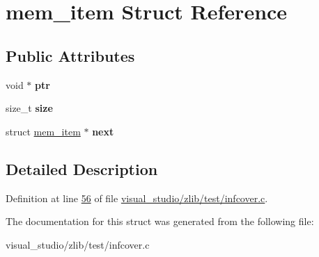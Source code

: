 \hypertarget{structmem__item}{}\section{mem\+\_\+item Struct Reference}
\label{structmem__item}
\subsection*{Public Attributes}
\begin{DoxyCompactItemize}
\item 
\mbox{\label{structmem__item_a486c57a912ffde6ffdb53d374d06114d}} 
void $\ast$ {\bfseries ptr}
\item 
\mbox{\label{structmem__item_acc5bc924e058e6ab12afa4d502522e56}} 
size\+\_\+t {\bfseries size}
\item 
\mbox{\label{structmem__item_abd83b4b290f08494909e7e7fce848690}} 
struct \hyperlink{structmem__item}{mem\+\_\+item} $\ast$ {\bfseries next}
\end{DoxyCompactItemize}


\subsection{Detailed Description}


Definition at line \hyperlink{visual__studio_2zlib_2test_2infcover_8c_source_l00056}{56} of file \hyperlink{visual__studio_2zlib_2test_2infcover_8c_source}{visual\+\_\+studio/zlib/test/infcover.\+c}.



The documentation for this struct was generated from the following file\+:\begin{DoxyCompactItemize}
\item 
visual\+\_\+studio/zlib/test/infcover.\+c\end{DoxyCompactItemize}
